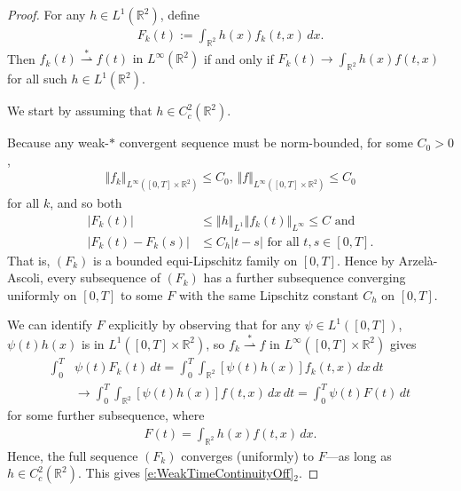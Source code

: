 \documentclass[11pt,reqno,xcolor=svgnames]{amsart}
\def\R{{\mathbb R}}
\theoremstyle{plain}
\theoremstyle{definition}
\theoremstyle{plain}
\theoremstyle{remark}
\newcommand{\abs}[1]{\left\vert#1\right\vert}
\newcommand{\iny}{\ensuremath{\infty}}
\newcommand{\norm}[1]{\ensuremath{\left\Vert #1 \right\Vert}}
\newcommand{\wstar}{\overset{*}{\rightharpoonup}}
\begin{document}
\begin{proof}
    For any $h \in L^1(\R^2)$, define
    \begin{align*}
        F_k(t) := \int_{\R^2} h(x) f_k(t, x) \, dx.
    \end{align*}
    Then $f_k(t) \wstar f(t) \text{ in } L^\iny(\R^2)$ if and only if $F_k(t) \to  \int_{\R^2} h(x) f(t, x)$ for all such $h \in L^1(\R^2)$.

    We start by assuming that $h \in C_c^2(\R^2)$.

    Because any weak-$*$ convergent sequence must be norm-bounded, for some $C_0 > 0$,
    \begin{align*}
        \norm{f_k}_{L^\iny([0, T] \times \R^2)} \le C_0, \,
        \norm{f}_{L^\iny([0, T] \times \R^2)} \le C_0
    \end{align*}
    for all $k$, and so both
    \begin{align*}
        \abs{F_k(t)}
            &\le \norm{h}_{L^1} \norm{f_k(t)}_{L^\iny}
            \le C \text{ and} \\
        \abs{F_k(t) - F_k(s)}
            &\le C_h \abs{t - s}
            \text{ for all } t, s \in [0, T].
    \end{align*}
    That is, $(F_k)$ is a bounded equi-Lipschitz family on $[0, T]$. Hence by
    Arzel\`{a}-Ascoli, every subsequence of $(F_k)$ has a further subsequence converging
    uniformly on $[0, T]$ to some $F$ with the same Lipschitz constant $C_h$ on $[0, T]$.

    We can identify $F$ explicitly by observing that
    for any $\psi \in L^1([0, T])$, $\psi(t) h(x)$ is in $L^1([0, T] \times \R^2)$, so $f_k \wstar f$ in $L^\iny([0, T] \times \R^2)$ gives
    \begin{align*}
        \int_0^T &\psi(t) F_k(t) \, dt
            = \int_0^T \int_{\R^2} [\psi(t) h(x)] f_k(t, x) \, dx \, dt \\
            &\to 
            \int_0^T \int_{\R^2} [\psi(t) h(x)] f(t, x) \, dx \, dt
            = \int_0^T \psi(t) F(t) \, dt
    \end{align*}
    for some further subsequence, where
    \begin{align*}
        F(t) = \int_{\R^2} h(x) f(t, x) \, dx.      
    \end{align*}
    Hence, the full sequence $(F_k)$ converges (uniformly) to $F$---as long as $h \in C_c^2(\R^2)$. This gives \cref{e:WeakTimeContinuityOff}$_2$.


\end{proof}
\end{document}
